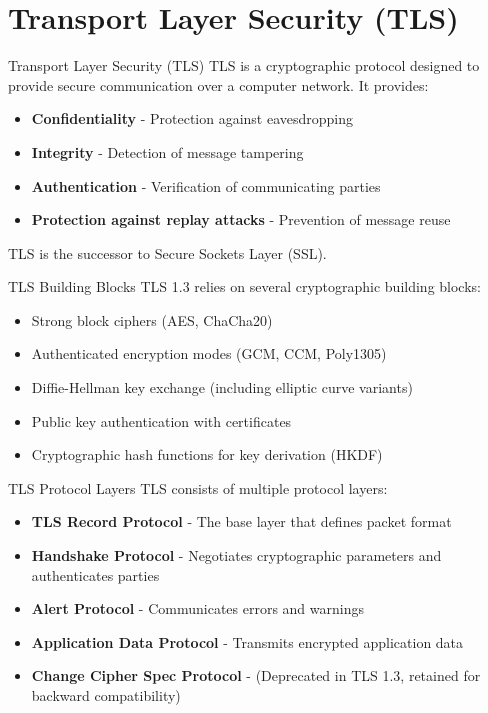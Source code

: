 \section{Transport Layer Security (TLS)}


\begin{definition}{Transport Layer Security (TLS)}
TLS is a cryptographic protocol designed to provide secure communication over a computer network. It provides:
\begin{itemize}
    \item \textbf{Confidentiality} - Protection against eavesdropping
    \item \textbf{Integrity} - Detection of message tampering
    \item \textbf{Authentication} - Verification of communicating parties
    \item \textbf{Protection against replay attacks} - Prevention of message reuse
\end{itemize}
TLS is the successor to Secure Sockets Layer (SSL).
\end{definition}


\begin{concept}{TLS Building Blocks}
TLS 1.3 relies on several cryptographic building blocks:
\begin{itemize}
    \item Strong block ciphers (AES, ChaCha20)
    \item Authenticated encryption modes (GCM, CCM, Poly1305)
    \item Diffie-Hellman key exchange (including elliptic curve variants)
    \item Public key authentication with certificates
    \item Cryptographic hash functions for key derivation (HKDF)
\end{itemize}
\end{concept}

\begin{concept}{TLS Protocol Layers}
TLS consists of multiple protocol layers:
\begin{itemize}
    \item \textbf{TLS Record Protocol} - The base layer that defines packet format
    \item \textbf{Handshake Protocol} - Negotiates cryptographic parameters and authenticates parties
    \item \textbf{Alert Protocol} - Communicates errors and warnings
    \item \textbf{Application Data Protocol} - Transmits encrypted application data
    \item \textbf{Change Cipher Spec Protocol} - (Deprecated in TLS 1.3, retained for backward compatibility)
\end{itemize}
\end{concept}

